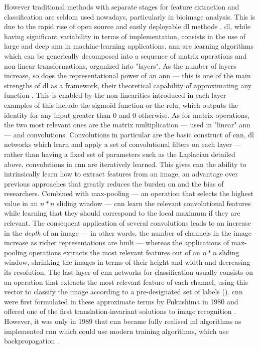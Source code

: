 However traditional methods with separate stages for feature extraction and classification are seldom used nowadays, particularly in bioimage analysis. This is due to the rapid rise of open source and easily deployable \ac{dl} methods \cite{Lucas2021-hc}. \Ac{dl}, while having significant variability in terms of implementation, consists in the use of large and deep \ac{ann} in machine-learning applications. \Ac{ann} are learning algorithms which can be generically decomposed into a sequence of matrix operations and non-linear transformations, organized into "layers". As the number of layers increase, so does the representational power of an \ac{ann} --- this is one of the main strengths of \ac{dl} as a framework, their theoretical capability of approximating any function \cite{Nielsen2015-wn}. This is enabled by the non-linearities introduced in each layer --- examples of this include the sigmoid function or the \ac{relu}, which outputs the identity for any input greater than $0$ and $0$ otherwise. As for matrix operations, the two most relevant ones are the matrix multiplication --- used in "linear" \ac{ann} --- and convolutions. Convolutions in particular are the basic construct of \ac{cnn}, \ac{dl} networks which learn and apply a set of convolutional filters on each layer --- rather than having a fixed set of parameters such as the Laplacian detailed above, convolutions in \ac{cnn} are iteratively learned. This gives \ac{cnn} the ability to intrinsically learn how to extract features from an image, an advantage over previous approaches that greatly reduces the burden on and the bias of researchers. Combined with max-pooling --- an operation that selects the highest value in an $n*n$ sliding window --- \ac{cnn} learn the relevant convolutional features while learning that they should correspond to the local maximum if they are relevant. The consequent application of several convolutions leads to an increase in the \textit{depth} of an image --- in other words, the number of channels in the image increase as richer representations are built --- whereas the applications of max-pooling operations extracts the most relevant features out of an $n*n$ sliding window, shrinking the images in terms of their height and width and decreasing its resolution. The last layer of \ac{cnn} networks for classification usually consists on an operation that extracts the most relevant feature of each channel, using this vector to classify the image according to a pre-designated set of labels (). \ac{cnn} were first formulated in these approximate terms by Fukushima in 1980 and offered one of the first translation-invariant solutions to image recognition \cite{Fukushima1980-bk}. However, it was only in 1989 that \ac{cnn} became fully realised \ac{ml} algorithms as  implemented \ac{cnn} which could use modern training algorithms, which use backpropagation \cite{LeCun1989-ro}. 

